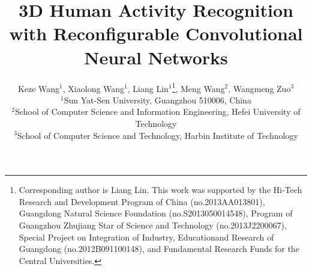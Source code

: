 \documentclass{sig-alternate}
\begin{document}
\title{3D Human Activity Recognition with Reconfigurable Convolutional Neural Networks}
%
\author{
%
%
\alignauthor
    Keze Wang$^{1}$, Xiaolong Wang$^{1}$, Liang Lin$^{1}$\thanks{Corresponding author is Liang Lin. This work 
was supported by the Hi-Tech Research and Development Program of China (no.2013AA013801), Guangdong Natural Science Foundation (no.S2013050014548), Program of Guangzhou Zhujiang Star of Science and Technology (no.2013J2200067), Special Project on Integration of Industry, Educationand Research of Guangdong (no.2012B091100148), and Fundamental Research Funds for the Central Universities.}, Meng Wang$^{2}$, Wangmeng Zuo$^{3}$\\
\affaddr
   $^1$Sun Yat-Sen University, Guangzhou 510006, China\\
   $^2$School of Computer Science and Information Engineering, Hefei University of Technology\\
   $^3$School of Computer Science and Technology, Harbin Institute of Technology\\
}
\end{document}
